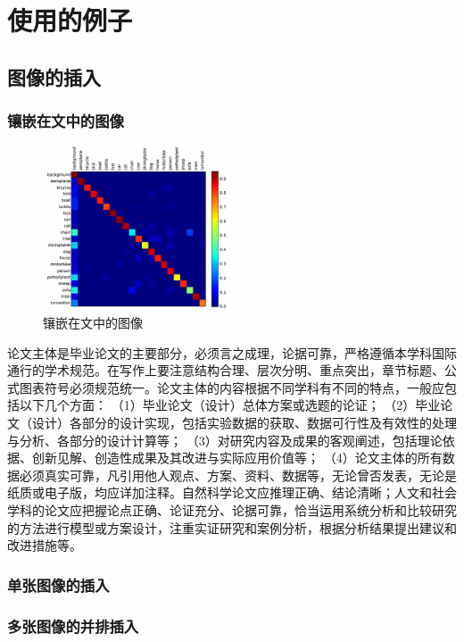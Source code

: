\chapter{使用的例子}
\label{cha:example}
\section{图像的插入}
\subsection{镶嵌在文中的图像}
\label{sec:Images}
\begin{figure}
	\centering
	\includegraphics[width=0.5\textwidth]{image/result/confusion.pdf}
	\caption{镶嵌在文中的图像}
	\label{fig:confusion}
\end{figure}
论文主体是毕业论文的主要部分，必须言之成理，论据可靠，严格遵循本学科国际通行的学术规范。在写作上要注意结构合理、层次分明、重点突出，章节标题、公式图表符号必须规范统一。论文主体的内容根据不同学科有不同的特点，一般应包括以下几个方面： （1）毕业论文（设计）总体方案或选题的论证； （2）毕业论文（设计）各部分的设计实现，包括实验数据的获取、数据可行性及有效性的处理与分析、各部分的设计计算等； （3）对研究内容及成果的客观阐述，包括理论依据、创新见解、创造性成果及其改进与实际应用价值等； （4）论文主体的所有数据必须真实可靠，凡引用他人观点、方案、资料、数据等，无论曾否发表，无论是纸质或电子版，均应详加注释。自然科学论文应推理正确、结论清晰；人文和社会学科的论文应把握论点正确、论证充分、论据可靠，恰当运用系统分析和比较研究的方法进行模型或方案设计，注重实证研究和案例分析，根据分析结果提出建议和改进措施等。
\subsection{单张图像的插入}


\subsection{多张图像的并排插入}
\label{sub:多张图像的并排插入}



